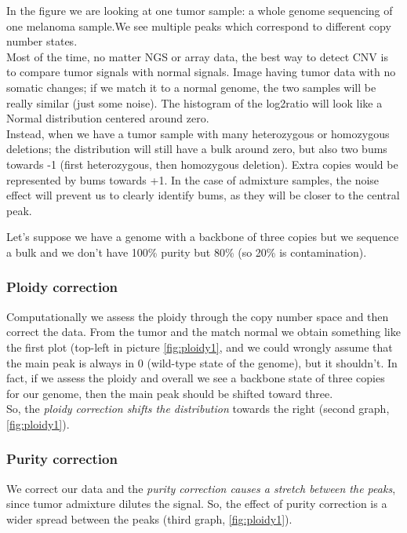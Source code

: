 In the figure we are looking at one tumor sample: a whole genome sequencing of one melanoma sample.We see multiple peaks which correspond to different copy number states.
\\
Most of the time, no matter NGS or array data, the best way to detect CNV is to compare tumor signals with normal signals. Image having tumor data with no somatic changes; if we match it to a normal genome, the two samples will be really similar (just some noise). The histogram of the log2ratio will look like a Normal distribution centered around zero.
\\
Instead, when we have a tumor sample with many heterozygous or homozygous deletions; the distribution will still have a bulk around zero, but also two bums towards -1 (first heterozygous, then homozygous deletion). Extra copies would be represented by bums towards +1. In the case of admixture samples, the noise effect will prevent us to clearly identify bums, as they will be closer to the central peak.

Let's suppose we have a genome with a backbone of three copies but we sequence a
bulk and we don't have 100\% purity but 80\% (so 20\% is contamination).

\subsubsection{Ploidy correction}
Computationally we assess the ploidy through the copy number space and then
correct the data.
From the tumor and the match normal we obtain something like the first plot (top-left in picture \ref{fig:ploidy1}, and we could wrongly assume that the main peak is always in 0 (wild-type state of the genome), but it shouldn't.
In fact, if we assess the ploidy and overall we see a backbone state of three copies for our genome, then the main peak should be shifted toward three.
\\
So, the \emph{ploidy correction shifts the distribution} towards the right (second graph, \ref{fig:ploidy1}).

\subsubsection{Purity correction}
We correct our data and the \emph{{purity correction causes a stretch between
the peaks}}, since tumor admixture dilutes the signal. So, the effect of purity
correction is a wider spread between the peaks (third graph, \ref{fig:ploidy1}).

